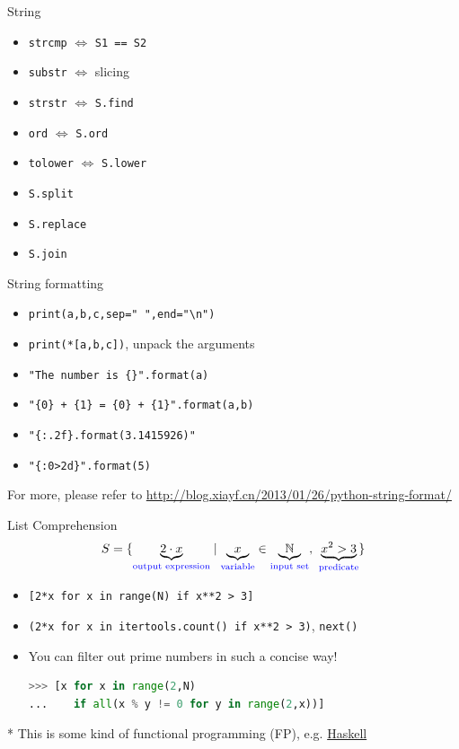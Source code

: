 \documentclass{../TexTemplate/myslide}
\begin{document}
\begin{frame}[fragile]{String}
\begin{itemize}
	\item \verb'strcmp' $\iff$ \verb'S1 == S2'
	\item \verb'substr' $\iff$ slicing
	\item \verb'strstr' $\iff$ \verb'S.find'
	\item \verb'ord' $\iff$ \verb'S.ord'
	\item \verb'tolower' $\iff$ \verb'S.lower'
	\item \verb'S.split'
	\item \verb'S.replace'
	\item \verb'S.join'
\end{itemize}
\end{frame}

\begin{frame}[fragile]{String formatting}
\begin{itemize}
	\item \verb'print(a,b,c,sep=" ",end="\n")'
	\item \verb'print(*[a,b,c])', unpack the arguments
	\item \verb;"The number is {}".format(a);
	\item \verb;"{0} + {1} = {0} + {1}".format(a,b);
	\item \verb;"{:.2f}.format(3.1415926)";
	\item \verb;"{:0>2d}".format(5);
\end{itemize}
For more, please refer to \url{http://blog.xiayf.cn/2013/01/26/python-string-format/}
\end{frame}

\begin{frame}[fragile]{List Comprehension}
\[{\displaystyle S=\{\underbrace {2\cdot x} _{\color {blue}{\text{output expression}}}\mid \underbrace {x} _{\color {blue}{\text{variable}}}\in \underbrace {\mathbb {N} } _{\color {blue}{\text{input set}}},\ \underbrace {x^{2}>3} _{\color {blue}{\text{predicate}}}\}}\]
\begin{itemize}
\item \verb'[2*x for x in range(N) if x**2 > 3]'
\item \verb'(2*x for x in itertools.count() if x**2 > 3)', \verb'next()'
\item You can filter out prime numbers in such a concise way!
\begin{lstlisting}[language=python]
>>> [x for x in range(2,N)
...    if all(x % y != 0 for y in range(2,x))]
\end{lstlisting}
\end{itemize}
* This is some kind of functional programming (FP), e.g. \href{https://www.haskell.org/}{Haskell}
\end{frame}
\end{document}

